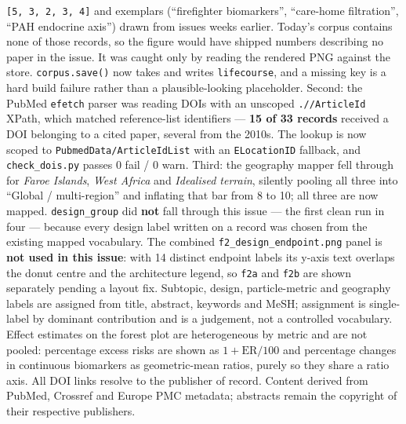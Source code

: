 \documentclass[10pt]{article}
\begin{document}
\begin{keybox}
{\texttt{[5, 3, 2, 3, 4]} and exemplars (``firefighter biomarkers'', ``care-home
filtration'', ``PAH endocrine axis'') drawn from issues weeks earlier. Today's corpus
contains none of those records, so the figure would have shipped numbers describing no
paper in the issue. It was caught only by reading the rendered PNG against the store.
\texttt{corpus.save()} now takes and writes \texttt{lifecourse}, and a missing key is a
hard build failure rather than a plausible-looking placeholder. Second: the PubMed
\texttt{efetch} parser was reading DOIs with an unscoped \texttt{.//ArticleId} XPath,
which matched reference-list identifiers --- \textbf{15 of 33 records} received a DOI
belonging to a cited paper, several from the 2010s. The lookup is now scoped to
\texttt{PubmedData/ArticleIdList} with an \texttt{ELocationID} fallback, and
\texttt{check\_dois.py} passes 0 fail / 0 warn. Third: the geography mapper fell through
for \emph{Faroe Islands}, \emph{West Africa} and \emph{Idealised terrain}, silently
pooling all three into ``Global / multi-region'' and inflating that bar from 8 to 10; all
three are now mapped. \texttt{design\_group} did \textbf{not} fall through this issue ---
the first clean run in four --- because every design label written on a record was chosen
from the existing mapped vocabulary. The combined \texttt{f2\_design\_endpoint.png} panel
is \textbf{not used in this issue}: with 14 distinct endpoint labels its y-axis text
overlaps the donut centre and the architecture legend, so \texttt{f2a} and \texttt{f2b}
are shown separately pending a layout fix.
Subtopic, design, particle-metric and geography labels are assigned from title, abstract,
keywords and MeSH; assignment is single-label by dominant contribution and is a judgement,
not a controlled vocabulary. Effect estimates on the forest plot are heterogeneous by
metric and are not pooled: percentage excess risks are shown as $1+\mathrm{ER}/100$ and
percentage changes in continuous biomarkers as geometric-mean ratios, purely so they share
a ratio axis.
All DOI links resolve to the publisher of record. Content derived from PubMed, Crossref
and Europe PMC metadata; abstracts remain the copyright of their respective publishers.\par}
\end{keybox}
\end{document}
